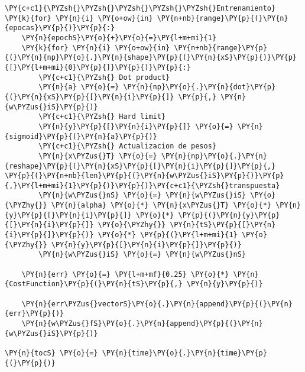     \begin{tcolorbox}[breakable, size=fbox, boxrule=1pt, pad at break*=1mm,colback=cellbackground, colframe=cellborder]
\begin{Verbatim}[commandchars=\\\{\}]
\PY{c+c1}{\PYZsh{}\PYZsh{}\PYZsh{}\PYZsh{}\PYZsh{}Entrenamiento}
\PY{k}{for} \PY{n}{i} \PY{o+ow}{in} \PY{n+nb}{range}\PY{p}{(}\PY{n}{epocas}\PY{p}{)}\PY{p}{:}
    \PY{n}{epochS}\PY{o}{+}\PY{o}{=}\PY{l+m+mi}{1}
    \PY{k}{for} \PY{n}{i} \PY{o+ow}{in} \PY{n+nb}{range}\PY{p}{(}\PY{n}{np}\PY{o}{.}\PY{n}{shape}\PY{p}{(}\PY{n}{xS}\PY{p}{)}\PY{p}{[}\PY{l+m+mi}{0}\PY{p}{]}\PY{p}{)}\PY{p}{:}
        \PY{c+c1}{\PYZsh{} Dot product}
        \PY{n}{a} \PY{o}{=} \PY{n}{np}\PY{o}{.}\PY{n}{dot}\PY{p}{(}\PY{n}{xS}\PY{p}{[}\PY{n}{i}\PY{p}{]} \PY{p}{,} \PY{n}{w\PYZus{}iS}\PY{p}{)}
        \PY{c+c1}{\PYZsh{} Hard limit}
        \PY{n}{y}\PY{p}{[}\PY{n}{i}\PY{p}{]} \PY{o}{=} \PY{n}{sigmoid}\PY{p}{(}\PY{n}{a}\PY{p}{)}
        \PY{c+c1}{\PYZsh{} Actualizacion de pesos}
        \PY{n}{x\PYZus{}T} \PY{o}{=} \PY{n}{np}\PY{o}{.}\PY{n}{reshape}\PY{p}{(}\PY{n}{xS}\PY{p}{[}\PY{n}{i}\PY{p}{]}\PY{p}{,} \PY{p}{(}\PY{n+nb}{len}\PY{p}{(}\PY{n}{w\PYZus{}iS}\PY{p}{)}\PY{p}{,}\PY{l+m+mi}{1}\PY{p}{)}\PY{p}{)}\PY{c+c1}{\PYZsh{}transpuesta}
        \PY{n}{w\PYZus{}nS} \PY{o}{=} \PY{n}{w\PYZus{}iS} \PY{o}{\PYZhy{}} \PY{n}{alpha} \PY{o}{*} \PY{n}{x\PYZus{}T} \PY{o}{*} \PY{n}{y}\PY{p}{[}\PY{n}{i}\PY{p}{]} \PY{o}{*} \PY{p}{(}\PY{n}{y}\PY{p}{[}\PY{n}{i}\PY{p}{]} \PY{o}{\PYZhy{}} \PY{n}{tS}\PY{p}{[}\PY{n}{i}\PY{p}{]}\PY{p}{)} \PY{o}{*} \PY{p}{(}\PY{l+m+mi}{1} \PY{o}{\PYZhy{}} \PY{n}{y}\PY{p}{[}\PY{n}{i}\PY{p}{]}\PY{p}{)}
        \PY{n}{w\PYZus{}iS} \PY{o}{=} \PY{n}{w\PYZus{}nS}
        
    \PY{n}{err} \PY{o}{=} \PY{l+m+mf}{0.25} \PY{o}{*} \PY{n}{CostFunction}\PY{p}{(}\PY{n}{tS}\PY{p}{,} \PY{n}{y}\PY{p}{)}
    
    \PY{n}{err\PYZus{}vectorS}\PY{o}{.}\PY{n}{append}\PY{p}{(}\PY{n}{err}\PY{p}{)}
    \PY{n}{w\PYZus{}fS}\PY{o}{.}\PY{n}{append}\PY{p}{(}\PY{n}{w\PYZus{}iS}\PY{p}{)}
    
\PY{n}{tocS} \PY{o}{=} \PY{n}{time}\PY{o}{.}\PY{n}{time}\PY{p}{(}\PY{p}{)}
\end{Verbatim}
\end{tcolorbox}

